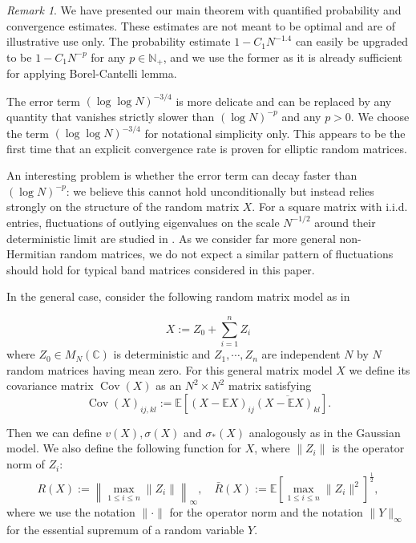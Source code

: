 \documentclass[11pt,reqno]{amsart}
\theoremstyle{plain}
\theoremstyle{remark}
\newtheorem{remark}[theorem]{Remark}
\numberwithin{equation}{section}
\begin{document}
\begin{remark}\label{quantifiedremarks}
We have presented our main theorem with quantified probability and convergence estimates. These estimates are not meant to be optimal and are of illustrative use only. The probability estimate $1-C_1N^{-1.4}$ can easily be upgraded to be $1-C_1N^{-p}$  for any $p\in\mathbb{N}_+$, and we use the former as it is already sufficient for applying Borel-Cantelli lemma. 

The error term $(\log\log N)^{-3/4}$ is more delicate and can be replaced by any quantity that vanishes strictly slower than $(\log N)^{-p}$ and any $p>0$. We choose the term $(\log\log N)^{-3/4}$ for notational simplicity only. This appears to be the first time that an explicit convergence rate is proven for elliptic random matrices.

An interesting problem is whether the error term can decay faster than $(\log N)^{-p}$: we believe this cannot hold unconditionally but instead relies strongly on the structure of the random matrix $X$. For a square matrix with i.i.d. entries, fluctuations of outlying eigenvalues on the scale $N^{-1/2}$ around their deterministic limit are studied in \cite{bordenave2016outlier}. As we consider far more general non-Hermitian random matrices, we do not expect a similar pattern of fluctuations should hold for typical band matrices considered in this paper.

\end{remark}


In the general case, consider the following random matrix model as in \cite{brailovskaya2022universality}

\begin{equation}\label{ageneralX}
    X:=Z_0+\sum_{i=1}^n Z_i
\end{equation} where $Z_0\in M_N(\mathbb C)$ is deterministic and $Z_1,\cdots,Z_n$ are independent $N$ by $N$ random matrices having mean zero. For this general matrix model $X$ we define its covariance matrix $\operatorname{Cov}(X)$ as an $N^2\times N^2$ matrix satisfying 
\begin{equation}
    \operatorname{Cov}(X)_{ij,kl}:=\mathbb{E}[(X-\mathbb{E}X)_{ij}\overline{(X-\mathbb{E}X)_{kl}}].
\end{equation}


Then we can define $v(X),\sigma(X)$ and $\sigma_*(X)$ analogously as in the Gaussian model.
We also define the following function for $X$, where $\|Z_i\|$ is the operator norm of $Z_i$:
\begin{equation} R(X):=\left\|\max_{1\leq i\leq n}\|Z_i\|\right\|_\infty,\quad 
    \bar{R}(X):=\mathbb{E}\left[\max_{1\leq i\leq n}\|Z_i\|^2\right]^\frac{1}{2},
\end{equation}
where we use the notation $\|\cdot\|$ for the operator norm and the notation $\|Y\|_\infty$ for the essential supremum of a random variable $Y$.
\end{document}
